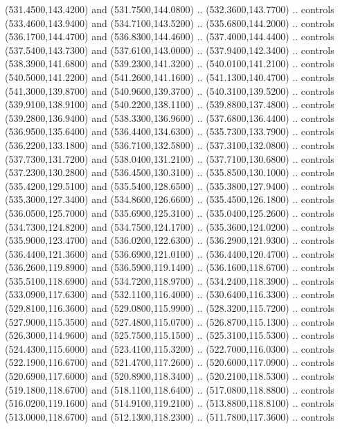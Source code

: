 {\begin{scope}[y=0.80pt, x=0.80pt, yscale=-1, xscale=1, inner sep=0pt, outer sep=0pt, #1]
      (531.4500,143.4200) and (531.7500,144.0800) .. (532.3600,143.7700) .. controls
      (533.4600,143.9400) and (534.7100,143.5200) .. (535.6800,144.2000) .. controls
      (536.1700,144.4700) and (536.8300,144.4600) .. (537.4000,144.4400) .. controls
      (537.5400,143.7300) and (537.6100,143.0000) .. (537.9400,142.3400) .. controls
      (538.3900,141.6800) and (539.2300,141.3200) .. (540.0100,141.2100) .. controls
      (540.5000,141.2200) and (541.2600,141.1600) .. (541.1300,140.4700) .. controls
      (541.3000,139.8700) and (540.9600,139.3700) .. (540.3100,139.5200) .. controls
      (539.9100,138.9100) and (540.2200,138.1100) .. (539.8800,137.4800) .. controls
      (539.2800,136.9400) and (538.3300,136.9600) .. (537.6800,136.4400) .. controls
      (536.9500,135.6400) and (536.4400,134.6300) .. (535.7300,133.7900) .. controls
      (536.2200,133.1800) and (536.7100,132.5800) .. (537.3100,132.0800) .. controls
      (537.7300,131.7200) and (538.0400,131.2100) .. (537.7100,130.6800) .. controls
      (537.2300,130.2800) and (536.4500,130.3100) .. (535.8500,130.1000) .. controls
      (535.4200,129.5100) and (535.5400,128.6500) .. (535.3800,127.9400) .. controls
      (535.3000,127.3400) and (534.8600,126.6600) .. (535.4500,126.1800) .. controls
      (536.0500,125.7000) and (535.6900,125.3100) .. (535.0400,125.2600) .. controls
      (534.7300,124.8200) and (534.7500,124.1700) .. (535.3600,124.0200) .. controls
      (535.9000,123.4700) and (536.0200,122.6300) .. (536.2900,121.9300) .. controls
      (536.4400,121.3600) and (536.6900,121.0100) .. (536.4400,120.4700) .. controls
      (536.2600,119.8900) and (536.5900,119.1400) .. (536.1600,118.6700) .. controls
      (535.5100,118.6900) and (534.7200,118.9700) .. (534.2400,118.3900) .. controls
      (533.0900,117.6300) and (532.1100,116.4000) .. (530.6400,116.3300) .. controls
      (529.8100,116.3600) and (529.0800,115.9900) .. (528.3200,115.7200) .. controls
      (527.9000,115.3500) and (527.4800,115.0700) .. (526.8700,115.1300) .. controls
      (526.3000,114.9600) and (525.7500,115.1500) .. (525.3100,115.5300) .. controls
      (524.4300,115.6000) and (523.4100,115.3200) .. (522.7000,116.0300) .. controls
      (522.1900,116.6700) and (521.4700,117.2600) .. (520.6000,117.0900) .. controls
      (520.6900,117.6000) and (520.8900,118.3400) .. (520.2100,118.5300) .. controls
      (519.1800,118.6700) and (518.1100,118.6400) .. (517.0800,118.8800) .. controls
      (516.0200,119.1600) and (514.9100,119.2100) .. (513.8800,118.8100) .. controls
      (513.0000,118.6700) and (512.1300,118.2300) .. (511.7800,117.3600) .. controls

\end{scope}}
